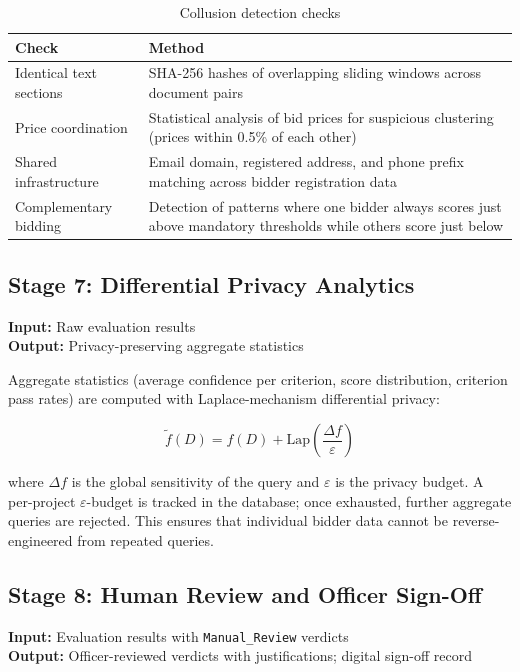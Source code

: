 \documentclass[12pt,a4paper]{article}
\begin{document}
\begin{table}[H]
\centering
\begin{tabularx}{\linewidth}{@{}lX@{}}
\toprule
\textbf{Check} & \textbf{Method} \\
\midrule
Identical text sections &
    SHA-256 hashes of overlapping sliding windows across document pairs \\[4pt]
Price coordination &
    Statistical analysis of bid prices for suspicious clustering
    (prices within 0.5\% of each other) \\[4pt]
Shared infrastructure &
    Email domain, registered address, and phone prefix matching across
    bidder registration data \\[4pt]
Complementary bidding &
    Detection of patterns where one bidder always scores just above
    mandatory thresholds while others score just below \\
\bottomrule
\end{tabularx}
\caption{Collusion detection checks}
\end{table}

\subsection{Stage 7: Differential Privacy Analytics}

\textbf{Input:} Raw evaluation results \\
\textbf{Output:} Privacy-preserving aggregate statistics

Aggregate statistics (average confidence per criterion, score distribution,
criterion pass rates) are computed with Laplace-mechanism differential privacy:

\begin{equation}
\tilde{f}(D) = f(D) + \text{Lap}\!\left(\frac{\Delta f}{\varepsilon}\right)
\end{equation}

where $\Delta f$ is the global sensitivity of the query and $\varepsilon$ is the
privacy budget. A per-project $\varepsilon$-budget is tracked in the database;
once exhausted, further aggregate queries are rejected. This ensures that
individual bidder data cannot be reverse-engineered from repeated queries.

\subsection{Stage 8: Human Review and Officer Sign-Off}

\textbf{Input:} Evaluation results with \texttt{Manual\_Review} verdicts \\
\textbf{Output:} Officer-reviewed verdicts with justifications; digital sign-off record
\end{document}
